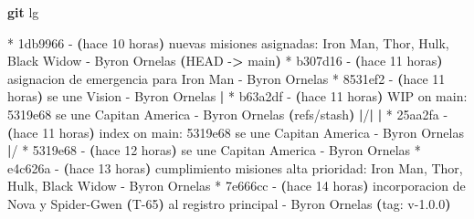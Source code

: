 \documentclass[
]{book}
\newenvironment{Shaded}{\begin{snugshade}}{\end{snugshade}}
\newcommand{\AttributeTok}[1]{\textcolor[rgb]{0.13,0.29,0.53}{#1}}
\newcommand{\ErrorTok}[1]{\textcolor[rgb]{0.64,0.00,0.00}{\textbf{#1}}}
\newcommand{\ExtensionTok}[1]{#1}
\newcommand{\FunctionTok}[1]{\textcolor[rgb]{0.13,0.29,0.53}{\textbf{#1}}}
\newcommand{\KeywordTok}[1]{\textcolor[rgb]{0.13,0.29,0.53}{\textbf{#1}}}
\newcommand{\NormalTok}[1]{#1}
\newcommand{\OperatorTok}[1]{\textcolor[rgb]{0.81,0.36,0.00}{\textbf{#1}}}
\begin{document}
\begin{Shaded}
\begin{Highlighting}[]
\FunctionTok{git}\NormalTok{ lg}
\end{Highlighting}
\end{Shaded}

\begin{Shaded}
\begin{Highlighting}[]
\ExtensionTok{*}\NormalTok{ 1db9966 }\AttributeTok{{-}} \ErrorTok{(}\ExtensionTok{hace}\NormalTok{ 10 horas}\KeywordTok{)} \ExtensionTok{nuevas}\NormalTok{ misiones asignadas: Iron Man, Thor, Hulk, Black Widow }\AttributeTok{{-}}\NormalTok{ Byron Ornelas }\ErrorTok{(}\ExtensionTok{HEAD} \AttributeTok{{-}}\OperatorTok{\textgreater{}}\NormalTok{ main}\KeywordTok{)}
\ExtensionTok{*}\NormalTok{ b307d16 }\AttributeTok{{-}} \ErrorTok{(}\ExtensionTok{hace}\NormalTok{ 11 horas}\KeywordTok{)} \ExtensionTok{asignacion}\NormalTok{ de emergencia para Iron Man }\AttributeTok{{-}}\NormalTok{ Byron Ornelas}
\ExtensionTok{*}\NormalTok{ 8531ef2 }\AttributeTok{{-}} \ErrorTok{(}\ExtensionTok{hace}\NormalTok{ 11 horas}\KeywordTok{)} \ExtensionTok{se}\NormalTok{ une Vision }\AttributeTok{{-}}\NormalTok{ Byron Ornelas}
\KeywordTok{|} \ExtensionTok{*}\NormalTok{ b63a2df }\AttributeTok{{-}} \ErrorTok{(}\ExtensionTok{hace}\NormalTok{ 11 horas}\KeywordTok{)} \ExtensionTok{WIP}\NormalTok{ on main: 5319e68 se une Capitan America }\AttributeTok{{-}}\NormalTok{ Byron Ornelas }\ErrorTok{(}\ExtensionTok{refs/stash}\KeywordTok{)}
\KeywordTok{|}\ExtensionTok{/}\KeywordTok{|} 
\KeywordTok{|} \ExtensionTok{*}\NormalTok{ 25aa2fa }\AttributeTok{{-}} \ErrorTok{(}\ExtensionTok{hace}\NormalTok{ 11 horas}\KeywordTok{)} \ExtensionTok{index}\NormalTok{ on main: 5319e68 se une Capitan America }\AttributeTok{{-}}\NormalTok{ Byron Ornelas}
\KeywordTok{|}\ExtensionTok{/}  
\ExtensionTok{*}\NormalTok{ 5319e68 }\AttributeTok{{-}} \ErrorTok{(}\ExtensionTok{hace}\NormalTok{ 12 horas}\KeywordTok{)} \ExtensionTok{se}\NormalTok{ une Capitan America }\AttributeTok{{-}}\NormalTok{ Byron Ornelas}
\ExtensionTok{*}\NormalTok{ e4c626a }\AttributeTok{{-}} \ErrorTok{(}\ExtensionTok{hace}\NormalTok{ 13 horas}\KeywordTok{)} \ExtensionTok{cumplimiento}\NormalTok{ misiones alta prioridad: Iron Man, Thor, Hulk, Black Widow }\AttributeTok{{-}}\NormalTok{ Byron Ornelas}
\ExtensionTok{*}\NormalTok{   7e666cc }\AttributeTok{{-}} \ErrorTok{(}\ExtensionTok{hace}\NormalTok{ 14 horas}\KeywordTok{)} \ExtensionTok{incorporacion}\NormalTok{ de Nova y Spider{-}Gwen }\ErrorTok{(}\ExtensionTok{T{-}65}\KeywordTok{)} \ExtensionTok{al}\NormalTok{ registro principal }\AttributeTok{{-}}\NormalTok{ Byron Ornelas }\ErrorTok{(}\ExtensionTok{tag:}\NormalTok{ v{-}1.0.0}\KeywordTok{)}

\end{Highlighting}
\end{Shaded}
\end{document}
